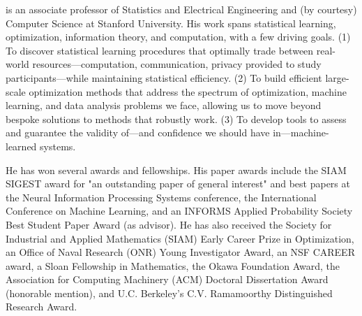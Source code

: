 is an associate professor of Statistics and Electrical Engineering and (by courtesy) Computer Science at Stanford University. His work spans statistical learning, optimization, information theory, and computation, with a few driving goals. (1) To discover statistical learning procedures that optimally trade between real-world resources---computation, communication, privacy provided to study participants---while maintaining statistical efficiency. (2) To build efficient large-scale optimization methods that address the spectrum of optimization, machine learning, and data analysis problems we face, allowing us to move beyond bespoke solutions to methods that robustly work. (3) To develop tools to assess and guarantee the validity of---and confidence we should have in---machine-learned systems.

He has won several awards and fellowships. His paper awards include the SIAM SIGEST award for "an outstanding paper of general interest" and best papers at the Neural Information Processing Systems conference, the International Conference on Machine Learning, and an INFORMS Applied Probability Society Best Student Paper Award (as advisor). He has also received the Society for Industrial and Applied Mathematics (SIAM) Early Career Prize in Optimization, an Office of Naval Research (ONR) Young Investigator Award, an NSF CAREER award, a Sloan Fellowship in Mathematics, the Okawa Foundation Award, the Association for Computing Machinery (ACM) Doctoral Dissertation Award (honorable mention), and U.C. Berkeley's C.V. Ramamoorthy Distinguished Research Award.
